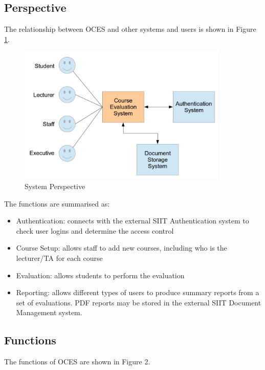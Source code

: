 \documentclass[12pt, a4paper]{report}
\begin{document}
\subsection{Perspective}
The relationship between OCES and other systems and users is shown in Figure \ref{fig2}.

\begin{figure}[h]
\begin{center}
\includegraphics[keepaspectratio=true,width=10cm]{figure/f1}
\end{center}
\caption{System Perspective}
\label{fig2}
\end{figure}


The functions are summarised as:

\begin{itemize}
		\item Authentication: connects with the external SIIT Authentication system to check user logins and determine the access control
		\item Course Setup: allows staff to add new courses, including who is the lecturer/TA for each course
		\item Evaluation: allows students to perform the evaluation
		\item Reporting: allows different types of users to produce summary reports from a set of evaluations. PDF reports may be stored in the external SIIT Document Management system.
\end{itemize}




\subsection{Functions}

The functions of OCES are shown in Figure 2.
\end{document}
